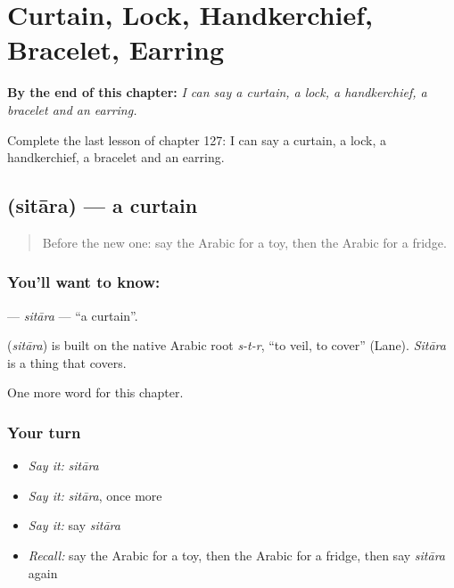 
\chapter{Curtain, Lock, Handkerchief, Bracelet, Earring}
\label{ch:ar-curtain-lock-handkerchief-bracelet-earring}

\begin{chapteropening}
\textbf{By the end of this chapter:} \emph{I can say a curtain, a lock, a handkerchief, a bracelet and an earring.}

Complete the last lesson of chapter 127: I can say a curtain, a lock, a handkerchief, a bracelet and an earring.
\end{chapteropening}

\section[\texorpdfstring{\ar{ستارة} (sitāra)}{ستارة (sitāra)}]{ (sitāra) — a curtain}

\label{lesson:AR-C127-sitara}



\begin{quote}
Before the new one: say the Arabic for a toy, then the Arabic for a fridge.
\end{quote}

\subsection*{You'll want to know: }
\textbf{} — \emph{sitāra} — \textquotedblleft{}a curtain\textquotedblright{}.

\begin{cousinweb}
\textbf{} (\emph{sitāra}) is built on the native Arabic root \emph{s-t-r}, \textquotedblleft{}to veil, to cover\textquotedblright{} (Lane). \emph{Sitāra} is a thing that covers.
\end{cousinweb}

\begin{grammarlens}[title={What you've built}]
One more word for this chapter.
\end{grammarlens}

\subsection*{Your turn}
\begin{itemize}
\raggedright
  \item \emph{Say it:} \emph{sitāra}
  \item \emph{Say it:} \emph{sitāra}, once more
  \item \emph{Say it:} say \emph{sitāra}
  \item \emph{Recall:} say the Arabic for a toy, then the Arabic for a fridge, then say \emph{sitāra} again
\end{itemize}

